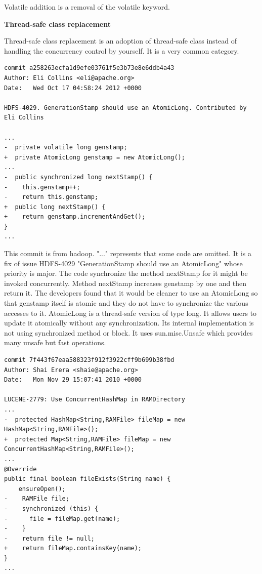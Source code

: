 \documentclass[conference]{IEEEtran}
\begin{document}
Volatile addition is a removal of the volatile keyword.

\textbf{Thread-safe class replacement}

Thread-safe class replacement is an adoption of thread-safe class instead of handling the concurrency control by yourself. It is a very common category. 

\begin{lstlisting}
commit a258263ecfa1d9efe03761f5e3b73e8e6ddb4a43
Author: Eli Collins <eli@apache.org>
Date:   Wed Oct 17 04:58:24 2012 +0000

HDFS-4029. GenerationStamp should use an AtomicLong. Contributed by Eli Collins

...
-  private volatile long genstamp;
+  private AtomicLong genstamp = new AtomicLong();
...
-  public synchronized long nextStamp() {
-    this.genstamp++;
-    return this.genstamp;
+  public long nextStamp() {
+    return genstamp.incrementAndGet();
}
...
\end{lstlisting}

This commit is from hadoop. "..." represents that some code are omitted. It is a fix of issue HDFS-4029 "GenerationStamp should use an AtomicLong" whose priority is major. The code synchronize the method nextStamp for it might be invoked concurrently. Method nextStamp increases genstamp by one and then return it. The developers found that it would be cleaner to use an AtomicLong so that genstamp itself is atomic and they do not have to synchronize the various accesses to it. AtomicLong is a thread-safe version of type long. It allows users to update it atomically without any synchronization. Its internal implementation is not using synchronized method or block. It uses sun.misc.Unsafe which provides many unsafe but fast operations.

\begin{lstlisting}
commit 7f443f67eaa588323f912f3922cff9b699b38fbd
Author: Shai Erera <shaie@apache.org>
Date:   Mon Nov 29 15:07:41 2010 +0000

LUCENE-2779: Use ConcurrentHashMap in RAMDirectory
...
-  protected HashMap<String,RAMFile> fileMap = new HashMap<String,RAMFile>();
+  protected Map<String,RAMFile> fileMap = new ConcurrentHashMap<String,RAMFile>();
...
@Override
public final boolean fileExists(String name) {
    ensureOpen();
-    RAMFile file;
-    synchronized (this) {
-      file = fileMap.get(name);
-    }
-    return file != null;
+    return fileMap.containsKey(name);
}
...
\end{lstlisting}
\end{document}
